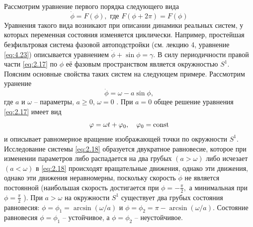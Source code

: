 Рассмотрим  уравнение первого порядка следующего вида
\begin{equation}
    \label{eq:2.17}
    \dot \phi = F(\phi) , \text{ где } F( \phi + 2 \pi) = F( \phi ) 
\end{equation}
Уравнения такого вида возникают при описании динамики реальных систем, у которых переменная состояния изменяется циклически. Например, простейшая безфильтровая система фазовой автоподстройки (см. лекцию 4, уравнение \eqref{eq:4.23}) описывается уравнением $\dot \phi + \sin \phi = \gamma$. В силу периодичности правой части \eqref{eq:2.17} по $\phi$ её фазовым пространством является окружностью $S^1$. Поясним основные свойства таких систем на следующем примере. Рассмотрим уранение
\begin{equation}
    \label{eq:2.18}
    \dot \phi = \omega - a \sin \phi   , 
\end{equation}
где $a$ и $ \omega$ -- параметры, $a\geq0$, $\omega=0$ . При $a=0$ общее решение уравнения \eqref{eq:2.17} имеет вид
\begin{equation}
    \label{eq:}
    \varphi = \omega t + \varphi_0, \quad \varphi_0= \textrm{const}
\end{equation}
и описывает равномерное вращение изображающей точки по окружности $S^1$. Исследование системы \eqref{eq:2.18} образуется двукратное равновесие, которое при изменении параметров либо распадается на два грубых $(a > \omega)$ либо исчезает  $(a<\omega)$ в \eqref{eq:2.18} происходят вращательные движения, однако эти движения, однако эти движения неравномерны, поскольку скорость $\dot \phi$ не является постоянной (наибольшая скорость достигается при $\phi = - \frac{\pi}{2},$ а минимальная при  $\phi = \frac{\pi}{2}$ ). При $a>\omega$ на окружности $S^1$ существует два грубых состояния равновесия: $\phi = \phi_1 = \arcsin(\omega/a)$ и $\phi = \phi_2= \pi - \arcsin(\omega/a)$. Состояние равновесия $\phi=\phi_1$ -- устойчивое, а $\phi = \phi_2$ -- неустойчивое.

